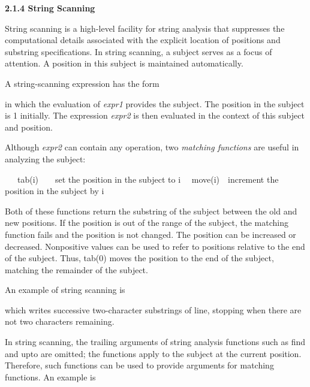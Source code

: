 {\sffamily\bfseries
2.1.4 String Scanning}

String scanning is a high-level facility for string analysis that
suppresses the computational details associated with the explicit
location of positions and substring specifications. In string
scanning, a subject serves as a focus of attention. A position in this
subject is maintained automatically.


A string-scanning expression has the form



\noindent in which the evaluation of \textit{expr1} provides the
subject. The position in the subject is 1 initially. The expression
\textit{expr2} is then evaluated in the context of this subject and
position.


Although \textit{expr2} can contain any operation, two
\textit{matching functions} are useful in analyzing the subject:


\ \ \ tab(i)\ \ \ \ set the position in the subject to i\newline
 \ \ move(i)\ \ increment the position in the subject by i


Both of these functions return the substring of the subject between
the old and new positions. If the position is out of the range of the
subject, the matching function fails and the position is not
changed. The position can be increased or decreased. Nonpositive
values can be used to refer to positions relative to the end of the
subject. Thus, tab(0) moves the position to the end of the subject,
matching the remainder of the subject.


An example of string scanning is



\noindent which writes successive two-character substrings of line,
stopping when there are not two characters remaining.

In string scanning, the trailing arguments of string analysis
functions such as find and upto are omitted; the functions apply to
the subject at the current position. Therefore, such functions can be
used to provide arguments for matching functions. An example is



